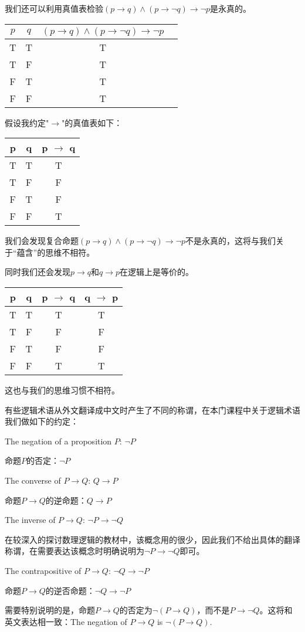 \documentclass{article}
\begin{document}
\begin{CJK}{UTF8}{gbsn}
  我们还可以利用真值表检验$(p\to q) \land (p\to \lnot q) \to \lnot p$是永真的。
  
      \begin{tabular}{cc|cc}
    $p$& $q$&$(p\to q) \land (p\to \lnot q) \to \lnot p$\\
    \hline
    T&T&T\\
    T&F&T\\
    F&T&T\\
    F&F&T\\      
      \end{tabular}

      假设我约定"$\to$"的真值表如下：

    \begin{tabular}{cc|c}
    p& q& p $\to$ q\\
    \hline
    T&T&T\\
    T&F&F\\
    F&T&F\\
    F&F&T\\
    \end{tabular}\hspace{0.87cm}

    我们会发现复合命题$(p\to q) \land (p\to \lnot q) \to \lnot p$不是永真的，这将与我们关于“蕴含”的思维不相符。

    同时我们还会发现$p \to q$和$q\to p$在逻辑上是等价的。

    \begin{tabular}{cc|cc}
    p& q& p $\to$ q&q $\to$ p\\
    \hline
    T&T&T&T\\
    T&F&F&F\\
    F&T&F&F\\
    F&F&T&T\\
    \end{tabular}\hspace{0.87cm}

    这也与我们的思维习惯不相符。

    

  
  有些逻辑术语从外文翻译成中文时产生了不同的称谓，在本门课程中关于逻辑术语我们做如下的约定：


  The negation of a proposition $P$: $\lnot P$

  命题$P$的否定：$\lnot P$

  The converse of $P\to Q$: $Q \to P$

  命题$P\to Q$的逆命题：$Q\to P$



  The inverse of $P\to Q$: $\lnot P \to \lnot Q$
  
  在较深入的探讨数理逻辑的教材中，该概念用的很少，因此我们不给出具体的翻译称谓，在需要表达该概念时明确说明为$\lnot P \to \lnot Q$即可。

  
  The contrapositive of $P\to Q$: $\lnot Q \to \lnot P$

  命题$P\to Q$的逆否命题：$\lnot Q \to \lnot P$

  需要特别说明的是，命题$P\to Q$的否定为$\lnot (P \to Q)$，而不是$P \to \lnot Q$。这将和英文表达相一致：The negation of $P\to Q$ is $\lnot (P \to Q)$. 

  
  

  
\end{CJK}
\end{document}
